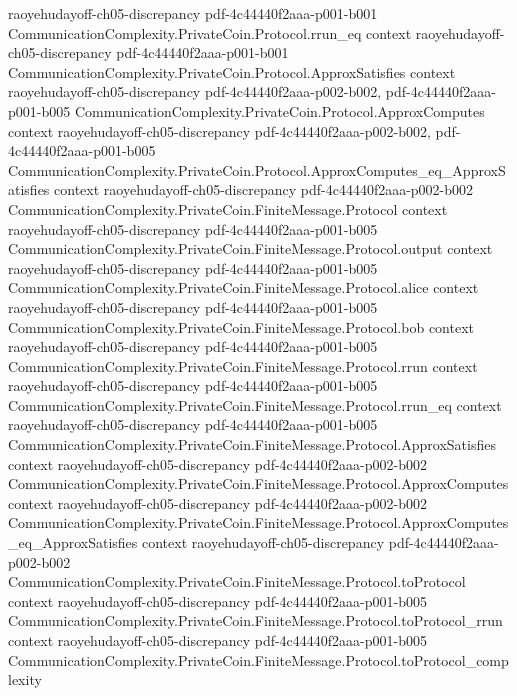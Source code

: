 \begin{lemma}
  {raoyehudayoff-ch05-discrepancy}
  {pdf-4c44440f2aaa-p001-b001}
\proofstep
  {CommunicationComplexity.PrivateCoin.Protocol.rrun_eq}
  {context}
  {raoyehudayoff-ch05-discrepancy}
  {pdf-4c44440f2aaa-p001-b001}
\proofstep
  {CommunicationComplexity.PrivateCoin.Protocol.ApproxSatisfies}
  {context}
  {raoyehudayoff-ch05-discrepancy}
  {pdf-4c44440f2aaa-p002-b002,
    pdf-4c44440f2aaa-p001-b005}
\proofstep
  {CommunicationComplexity.PrivateCoin.Protocol.ApproxComputes}
  {context}
  {raoyehudayoff-ch05-discrepancy}
  {pdf-4c44440f2aaa-p002-b002,
    pdf-4c44440f2aaa-p001-b005}
\proofstep
  {CommunicationComplexity.PrivateCoin.Protocol.ApproxComputes_eq_ApproxSatisfies}
  {context}
  {raoyehudayoff-ch05-discrepancy}
  {pdf-4c44440f2aaa-p002-b002}
\proofstep
  {CommunicationComplexity.PrivateCoin.FiniteMessage.Protocol}
  {context}
  {raoyehudayoff-ch05-discrepancy}
  {pdf-4c44440f2aaa-p001-b005}
\proofstep
  {CommunicationComplexity.PrivateCoin.FiniteMessage.Protocol.output}
  {context}
  {raoyehudayoff-ch05-discrepancy}
  {pdf-4c44440f2aaa-p001-b005}
\proofstep
  {CommunicationComplexity.PrivateCoin.FiniteMessage.Protocol.alice}
  {context}
  {raoyehudayoff-ch05-discrepancy}
  {pdf-4c44440f2aaa-p001-b005}
\proofstep
  {CommunicationComplexity.PrivateCoin.FiniteMessage.Protocol.bob}
  {context}
  {raoyehudayoff-ch05-discrepancy}
  {pdf-4c44440f2aaa-p001-b005}
\proofstep
  {CommunicationComplexity.PrivateCoin.FiniteMessage.Protocol.rrun}
  {context}
  {raoyehudayoff-ch05-discrepancy}
  {pdf-4c44440f2aaa-p001-b005}
\proofstep
  {CommunicationComplexity.PrivateCoin.FiniteMessage.Protocol.rrun_eq}
  {context}
  {raoyehudayoff-ch05-discrepancy}
  {pdf-4c44440f2aaa-p001-b005}
\proofstep
  {CommunicationComplexity.PrivateCoin.FiniteMessage.Protocol.ApproxSatisfies}
  {context}
  {raoyehudayoff-ch05-discrepancy}
  {pdf-4c44440f2aaa-p002-b002}
\proofstep
  {CommunicationComplexity.PrivateCoin.FiniteMessage.Protocol.ApproxComputes}
  {context}
  {raoyehudayoff-ch05-discrepancy}
  {pdf-4c44440f2aaa-p002-b002}
\proofstep
  {CommunicationComplexity.PrivateCoin.FiniteMessage.Protocol.ApproxComputes_eq_ApproxSatisfies}
  {context}
  {raoyehudayoff-ch05-discrepancy}
  {pdf-4c44440f2aaa-p002-b002}
\proofstep
  {CommunicationComplexity.PrivateCoin.FiniteMessage.Protocol.toProtocol}
  {context}
  {raoyehudayoff-ch05-discrepancy}
  {pdf-4c44440f2aaa-p001-b005}
\proofstep
  {CommunicationComplexity.PrivateCoin.FiniteMessage.Protocol.toProtocol_rrun}
  {context}
  {raoyehudayoff-ch05-discrepancy}
  {pdf-4c44440f2aaa-p001-b005}
\proofstep
  {CommunicationComplexity.PrivateCoin.FiniteMessage.Protocol.toProtocol_complexity}

\end{lemma}
